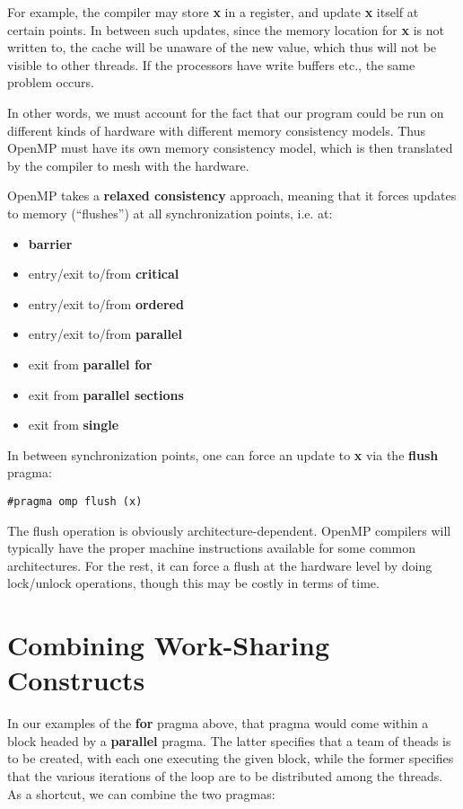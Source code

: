 For example, the compiler may store {\bf x} in a register, and update
{\bf x} itself at certain points.  In between such updates, since the
memory location for {\bf x} is not written to, the cache will be unaware
of the new value, which thus will not be visible to other threads.  If
the processors have write buffers etc., the same problem occurs.

In other words, we must account for the fact that our program could be
run on different kinds of hardware with different memory consistency
models.  Thus OpenMP must have its own memory consistency model, which
is then translated by the compiler to mesh with the hardware.

OpenMP takes a {\bf relaxed consistency} approach, meaning that it
forces updates to memory (``flushes'') at all synchronization points,
i.e. at:

\begin{itemize}
\item {\bf barrier}
\item entry/exit to/from {\bf critical}
\item entry/exit to/from {\bf ordered}
\item entry/exit to/from {\bf parallel}
\item exit from {\bf parallel for}
\item exit from {\bf parallel sections}
\item exit from {\bf single}
\end{itemize}

In between synchronization points, one can force an update to {\bf x}
via the {\bf flush} pragma:

\begin{Verbatim}[fontsize=\relsize{-2}]
#pragma omp flush (x)
\end{Verbatim}

The flush operation is obviously architecture-dependent.  OpenMP
compilers will typically have the proper machine instructions available
for some common architectures.  For the rest, it can force a flush at
the hardware level by doing lock/unlock operations, though this may be
costly in terms of time.

\section{Combining Work-Sharing Constructs}

In our examples of the {\bf for} pragma above, that pragma would come
within a block headed by a {\bf parallel} pragma.  The latter specifies
that a team of theads is to be created, with each one executing the
given block, while the former specifies that the various iterations of
the loop are to be distributed among the threads.  As a shortcut, we can
combine the two pragmas:

